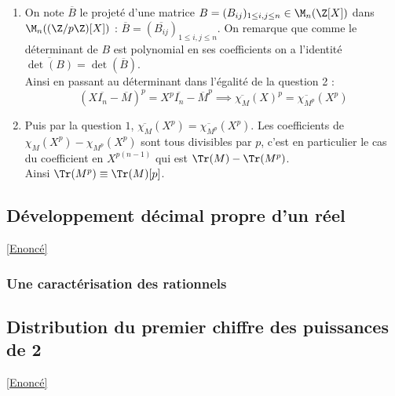 \documentclass[8pt]{book}
\begin{document}
\begin{enumerate}[leftmargin=*]
	En posant $P_{ij}(X)=X\delta_{ij}-M_{ij}$ cette dernière expression est égale à $\overline{P_{ij}}(X)^p-\overline{P_{ij}}(X^p)$.\\
	D'après la question $1$, $(X\delta_{ij}-M_{ij})^p-(X^p\delta_{ij}-M_{ij}^p)\in p\Z[X]$.\\
	Ainsi la matrice $A=\left(\dfrac{P_{ij}(X)^p-P_{ij}(X^p)}{p}\right)\in \M_n(\Z[X])$ et vérifie $(XI_n-M)^p-(X^pI_n-M^p)=pA$.
	\item On note $\overline B$ le projeté d'une matrice $B=(B_{ij})_{1\leq i,j\leq n}\in \M_n(\Z[X])$ dans $\M_n((\Z/p\Z)[X])$ : $\overline B=(\overline{B_{ij}})_{1\leq i,j\leq n}$. On remarque que comme le déterminant de $B$ est polynomial en ses coefficients on a l'identité $\overline{\det(B)}=\det(\overline B)$.\\
	Ainsi en passant au déterminant dans l'égalité de la question 2 : $$(X\overline{I_n}-\overline M)^p=X^p\overline{I_n}-\overline{M}^p\implies \overline{\chi_M}(X)^p=\overline{\chi_{M^p}}(X^p)$$
	\item Puis par la question $1$, $\overline{\chi_M}(X^p)=\overline{\chi_{M^p}}(X^p)$. Les coefficients de $\chi_M(X^p)-\chi_{M^p}(X^p)$ sont tous divisibles par $p$, c'est en particulier le cas du coefficient en $X^{p(n-1)}$ qui est $\Tr(M)-\Tr(M^p)$.\\
	Ainsi $\Tr(M^p)\equiv \Tr(M)[p]$.
\end{enumerate}

\subsection{Développement décimal propre d'un réel}
\label{Développement décimal propre d'un réel corrigé}
\textcolor{blue}{\hyperref[Développement décimal propre d'un réel]{[Enoncé]}}\\

\subsubsection{Une caractérisation des rationnels}
	
\subsection{Distribution du premier chiffre des puissances de 2}
\label{Distribution du premier chiffre des puissances de 2 corrigé}
\textcolor{blue}{\hyperref[Distribution du premier chiffre des puissances de 2]{[Enoncé]}}\\
	
	
	
	
	
	
	
\end{document}

